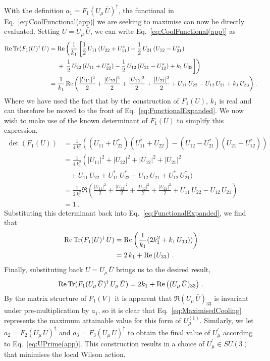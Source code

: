With the definition $a_1 = F_1(U_\mu\,\bar{U})^\dagger$, the functional in Eq.~\ref{eq:CoolFunctional(app)} we are seeking to maximise can now be directly evaluated. Setting $U = U_\mu\,\bar{U}$, we can write Eq.~\ref{eq:CoolFunctional(app)} as 
%
\begin{align}
\operatorname{Re}\operatorname{Tr}(F_1(U)^\dagger\, U) &=\operatorname{Re} \left(\frac{1}{k_1}\left[ \frac{1}{2}\,U_{11} \left(U_{22} + U_{11}^*\right) - \frac{1}{2}\,U_{21} \left(U_{12} - U_{21}^*\right)\right.\right.\nonumber\\
&~~~~+ \left. \left.\frac{1}{2}\,U_{22} \left(U_{11} + U_{22}^*\right)
- \frac{1}{2}\,U_{12} \left(U_{21} - U_{12}^*\right) +k_1\,U_{33}\right]\right)\nonumber\\
&= \frac{1}{k_1}\operatorname{Re}\left(\frac{|U_{11}|^2}{2} + \frac{|U_{22}|^2}{2} + \frac{|U_{12}|^2}{2} + \frac{|U_{21}|^2}{2} + U_{11}\,U_{22} - U_{12}\,U_{21} + k_1\,U_{33}\right)\, .\label{eq:FunctionalExpanded}
\end{align}
%
Where we have used the fact that by the construction of $F_1(U)$, $k_1$ is real and can therefore be moved to the front of Eq.~\ref{eq:FunctionalExpanded}. We now wish to make use of the known determinant of $F_1(U)$ to simplify this expression.
%
\begin{align*}
\det(F_1(U)) &= \frac{1}{4\,k_1^2} \left(\left(U_{11}+ U_{22}^*\right)\left(U_{11}^* + U_{22}\right)-\left(U_{12} - U_{21}^*\right)\left( U_{21} - U_{12}^*\right)\right)\\
&=\frac{1}{4\,k_1^2}\left( |U_{11}|^2 + |U_{22}|^2 + |U_{12}|^2 + |U_{21}|^2\right.\\
&~~~~+ U_{11}\,U_{22} + U_{11}^*\,U_{22}^* + U_{12}\,U_{21} + U_{12}^*\,U_{21}^*\big)\\
&= \frac{1}{2\,k_1^2}\Re\left(\frac{|U_{11}|^2}{2} + \frac{|U_{22}|^2}{2} + \frac{|U_{12}|^2}{2} + \frac{|U_{21}|^2}{2} + U_{11}\,U_{22} - U_{12}\,U_{21}\right)\\
&=1\, .
\end{align*}
%
Substituting this determinant back into Eq.~\ref{eq:FunctionalExpanded}, we find that
%
\begin{align*}
\operatorname{Re}\operatorname{Tr}(F_1(U)^\dagger\, U) &= \operatorname{Re}\left(\frac{1}{k_1}(2k_1^2 + k_1\,U_{33}))\right)\\
&=2\,k_1 + \operatorname{Re}\left(U_{33}\right)\, .
\end{align*}
%
Finally, substituting back $U = U_\mu\,\bar{U}$ brings us to the desired result,
%
\begin{equation}
\operatorname{Re} \operatorname{Tr} (F_1(U_\mu\,\bar{U})^\dagger \, U_\mu \, \bar{U}) = 2k_1 + \operatorname{Re}\left( (U_\mu\, \bar{U})_{33}\right)\, .
\label{eq:MaximisedCooling}
\end{equation}
%
By the matrix structure of $F_1(V)$ it is apparent that $\Re(U_\mu\, \bar{U})_{33}$ is invariant under pre-multiplication by $a_1$, so it is clear that Eq.~\ref{eq:MaximisedCooling} represents the maximum attainable value for this form of $U^{(1)}_\mu$. Similarly, we let $a_2=F_2(U_\mu\,\bar{U})^\dagger$ and $a_3=F_3(U_\mu\,\bar{U})^\dagger$ to obtain the final value of $U^\prime_\mu$ according to Eq.~\ref{eq:UPrime(app)}. This construction results in a choice of $U_\mu^\prime \in SU(3)$ that minimises the local Wilson action.

